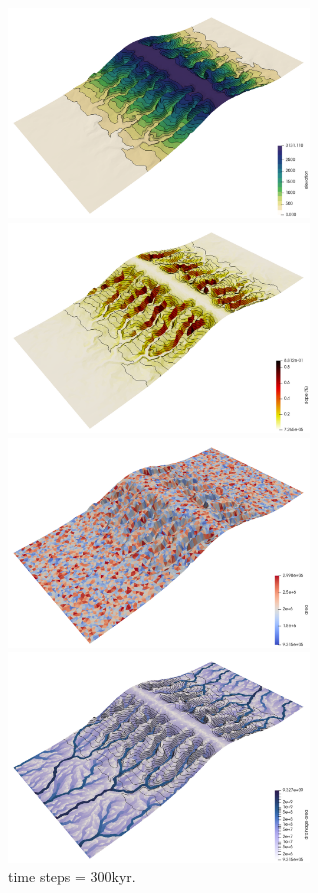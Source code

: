 \begin{center}
\includegraphics[width=8cm]{python_codes/fieldstone_140/results/exp5/elevation.png}
\includegraphics[width=8cm]{python_codes/fieldstone_140/results/exp5/slope}\\
\includegraphics[width=8cm]{python_codes/fieldstone_140/results/exp5/area}
\includegraphics[width=8cm]{python_codes/fieldstone_140/results/exp5/drainage}\\
{ time steps = 300kyr.}
\end{center}

